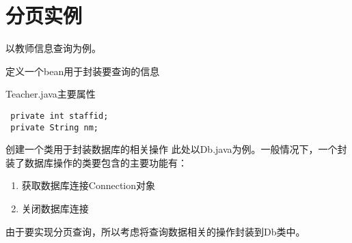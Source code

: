 \documentclass{beamer}
\begin{document}
\section{分页实例}
\begin{frame}
以教师信息查询为例。
\end{frame}
\begin{frame}[fragile]{定义一个bean用于封装要查询的信息}
\begin{block}{Teacher.java主要属性}
\begin{verbatim}
 private int staffid;
 private String nm;
\end{verbatim}
\end{block}

\end{frame}

\begin{frame}[fragile]{创建一个类用于封装数据库的相关操作}
此处以Db.java为例。一般情况下，一个封装了数据库操作的类要包含的主要功能有：
\begin{enumerate}
\item
获取数据库连接Connection对象
\item
关闭数据库连接
\end{enumerate}
由于要实现分页查询，所以考虑将查询数据相关的操作封装到Db类中。
\end{frame}
\end{document}
